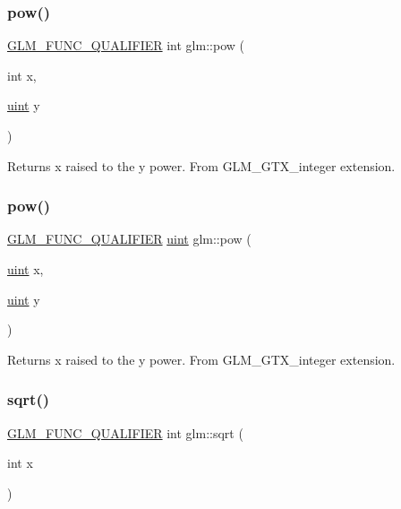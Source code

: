 \subsubsection{\texorpdfstring{pow()}{pow()}\hspace{0.1cm}{\footnotesize\ttfamily [1/2]}}
{\footnotesize\ttfamily \hyperlink{setup_8hpp_a33fdea6f91c5f834105f7415e2a64407}{G\+L\+M\+\_\+\+F\+U\+N\+C\+\_\+\+Q\+U\+A\+L\+I\+F\+I\+ER} int glm\+::pow (\begin{DoxyParamCaption}\item[{int}]{x,  }\item[{\hyperlink{group__core__precision_ga4fd29415871152bfb5abd588334147c8}{uint}}]{y }\end{DoxyParamCaption})}

Returns x raised to the y power. From G\+L\+M\+\_\+\+G\+T\+X\+\_\+integer extension. \mbox{\label{group__gtx__integer_gaa8229e850c3cc4ad83492fe390ada044}} 
\subsubsection{\texorpdfstring{pow()}{pow()}\hspace{0.1cm}{\footnotesize\ttfamily [2/2]}}
{\footnotesize\ttfamily \hyperlink{setup_8hpp_a33fdea6f91c5f834105f7415e2a64407}{G\+L\+M\+\_\+\+F\+U\+N\+C\+\_\+\+Q\+U\+A\+L\+I\+F\+I\+ER} \hyperlink{group__core__precision_ga4fd29415871152bfb5abd588334147c8}{uint} glm\+::pow (\begin{DoxyParamCaption}\item[{\hyperlink{group__core__precision_ga4fd29415871152bfb5abd588334147c8}{uint}}]{x,  }\item[{\hyperlink{group__core__precision_ga4fd29415871152bfb5abd588334147c8}{uint}}]{y }\end{DoxyParamCaption})}

Returns x raised to the y power. From G\+L\+M\+\_\+\+G\+T\+X\+\_\+integer extension. \mbox{\label{group__gtx__integer_ga78e2e68330e91d350fcfc2f4831cad12}} 
\subsubsection{\texorpdfstring{sqrt()}{sqrt()}\hspace{0.1cm}{\footnotesize\ttfamily [1/2]}}
{\footnotesize\ttfamily \hyperlink{setup_8hpp_a33fdea6f91c5f834105f7415e2a64407}{G\+L\+M\+\_\+\+F\+U\+N\+C\+\_\+\+Q\+U\+A\+L\+I\+F\+I\+ER} int glm\+::sqrt (\begin{DoxyParamCaption}\item[{int}]{x }\end{DoxyParamCaption})}

